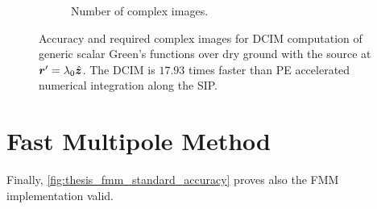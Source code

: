 \begin{figure}
    \begin{subfigure}[]{\textwidth}
        \centering
        \caption{Number of complex images.}
    \end{subfigure}

    \caption{Accuracy and required complex images for \ac{DCIM} computation
    of generic scalar Green's functions over dry ground with the source at
    $\rsrc = \lambda_0 \uv{z}$.
    The \ac{DCIM} is $\num{17.93}$ times faster than \ac{PE} accelerated
    numerical integration along the \ac{SIP}.}
    \label{fig:dcim_dry_ground}
\end{figure}


\section{Fast Multipole Method}

Finally, \cref{fig:thesis_fmm_standard_accuracy} proves also the \ac{FMM}
implementation valid.


